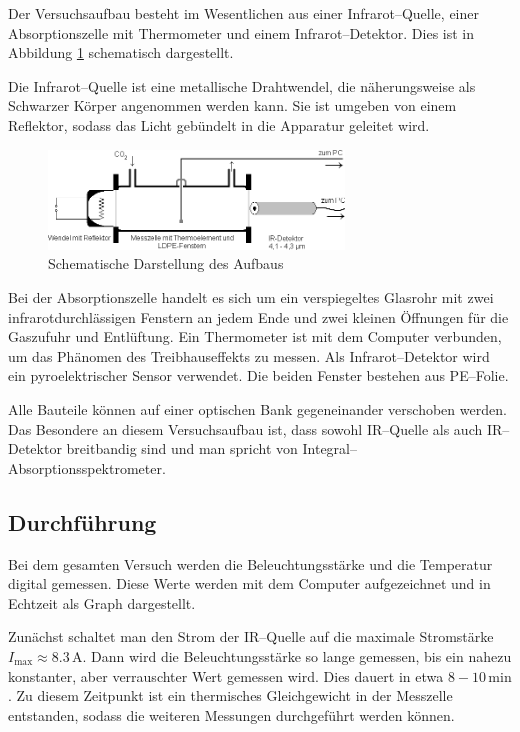 \documentclass[12pt,a4paper]{scrartcl}
\numberwithin{equation}{section} %
\begin{document}
	Der Versuchsaufbau besteht im Wesentlichen aus einer Infrarot--Quelle, einer Absorptionszelle mit Thermometer und einem Infrarot--Detektor. Dies ist in Abbildung \ref{abb:Aufbau} schematisch dargestellt.
	
	Die Infrarot--Quelle ist eine metallische Drahtwendel, die näherungsweise als Schwarzer Körper angenommen werden kann. Sie ist umgeben von einem Reflektor, sodass das Licht gebündelt in die Apparatur geleitet wird.
	
	\begin{figure}[h!]
		\centering
		\includegraphics[width=0.7\textwidth]{../media/B1.1/IR_Aufbau.png}
		\caption{Schematische Darstellung des Aufbaus \cite{UzK}}
		\label{abb:Aufbau}
	\end{figure}
	
	Bei der Absorptionszelle handelt es sich um ein verspiegeltes Glasrohr mit zwei infrarotdurchlässigen Fenstern an jedem Ende und zwei kleinen Öffnungen für die Gaszufuhr und Entlüftung. Ein Thermometer ist mit dem Computer verbunden, um das Phänomen des Treibhauseffekts zu messen. Als Infrarot--Detektor wird ein pyroelektrischer Sensor verwendet. Die beiden Fenster bestehen aus PE--Folie.
	
	Alle Bauteile können auf einer optischen Bank gegeneinander verschoben werden. Das Besondere an diesem Versuchsaufbau ist, dass sowohl IR--Quelle als auch IR--Detektor breitbandig sind und man spricht von Integral--Absorptionsspektrometer.
	
	\subsection{Durchführung}
	\label{durchfuehrung}
	Bei dem gesamten Versuch werden die Beleuchtungsstärke und die Temperatur digital gemessen. Diese Werte werden mit dem Computer aufgezeichnet und in Echtzeit als Graph dargestellt.
	
	Zunächst schaltet man den Strom der IR--Quelle auf die maximale Stromstärke $I_\mathrm{max}\approx 8.3\mathrm{\,A}$. Dann wird die Beleuchtungsstärke so lange gemessen, bis ein nahezu konstanter, aber verrauschter Wert gemessen wird. Dies dauert in etwa $8-10\mathrm{\,min}$. Zu diesem Zeitpunkt ist ein thermisches Gleichgewicht in der Messzelle entstanden, sodass die weiteren Messungen durchgeführt werden können.
	
\end{document}
